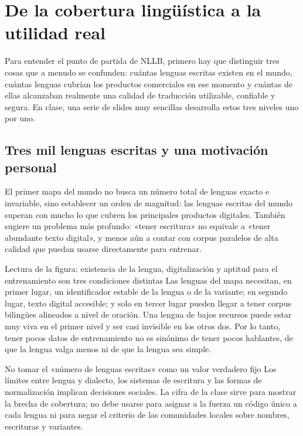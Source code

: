 \section{De la cobertura lingüística a la utilidad real}

Para entender el punto de partida de NLLB, primero hay que distinguir tres cosas que a menudo se confunden: cuántas lenguas escritas existen en el mundo, cuántas lenguas cubrían los productos comerciales en ese momento y cuántas de ellas alcanzaban realmente una calidad de traducción utilizable, confiable y segura. En clase, una serie de slides muy sencillas desarrolla estos tres niveles uno por uno.

\subsection{Tres mil lenguas escritas y una motivación personal}

El primer mapa del mundo no busca un número total de lenguas exacto e invariable, sino establecer un orden de magnitud: las lenguas escritas del mundo superan con mucho lo que cubren los principales productos digitales. También sugiere un problema más profundo: «tener escritura» no equivale a «tener abundante texto digital», y menos aún a contar con corpus paralelos de alta calidad que puedan usarse directamente para entrenar.


\begin{knowledgebox}{Lectura de la figura: existencia de la lengua, digitalización y aptitud para el entrenamiento son tres condiciones distintas}
Las lenguas del mapa necesitan, en primer lugar, un identificador estable de la lengua o de la variante; en segundo lugar, texto digital accesible; y solo en tercer lugar pueden llegar a tener corpus bilingües alineados a nivel de oración. Una lengua de bajos recursos puede estar muy viva en el primer nivel y ser casi invisible en los otros dos. Por lo tanto, tener pocos datos de entrenamiento no es sinónimo de tener pocos hablantes, de que la lengua valga menos ni de que la lengua sea simple.
\end{knowledgebox}

\begin{warningbox}{No tomar el «número de lenguas escritas» como un valor verdadero fijo}
Los límites entre lengua y dialecto, los sistemas de escritura y las formas de normalización implican decisiones sociales. La cifra de la clase sirve para mostrar la brecha de cobertura; no debe usarse para asignar a la fuerza un código único a cada lengua ni para negar el criterio de las comunidades locales sobre nombres, escrituras y variantes.
\end{warningbox}

